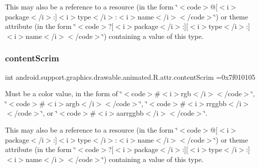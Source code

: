 This may also be a reference to a resource (in the form \char`\"{}$<$code$>$@\mbox{[}$<$i$>$package$<$/i$>$\+:\mbox{]}$<$i$>$type$<$/i$>$\+:$<$i$>$name$<$/i$>$$<$/code$>$\char`\"{}) or theme attribute (in the form \char`\"{}$<$code$>$?\mbox{[}$<$i$>$package$<$/i$>$\+:\mbox{]}\mbox{[}$<$i$>$type$<$/i$>$\+:\mbox{]}$<$i$>$name$<$/i$>$$<$/code$>$\char`\"{}) containing a value of this type. \mbox{\label{classandroid_1_1support_1_1graphics_1_1drawable_1_1animated_1_1R_1_1attr_a80ba71ce265dc918d7b421bb3894d965}} 
\subsubsection{\texorpdfstring{content\+Scrim}{contentScrim}}
{\footnotesize\ttfamily int android.\+support.\+graphics.\+drawable.\+animated.\+R.\+attr.\+content\+Scrim =0x7f010105\hspace{0.3cm}{\ttfamily [static]}}

Must be a color value, in the form of \char`\"{}$<$code$>$\#$<$i$>$rgb$<$/i$>$$<$/code$>$\char`\"{}, \char`\"{}$<$code$>$\#$<$i$>$argb$<$/i$>$$<$/code$>$\char`\"{}, \char`\"{}$<$code$>$\#$<$i$>$rrggbb$<$/i$>$$<$/code$>$\char`\"{}, or \char`\"{}$<$code$>$\#$<$i$>$aarrggbb$<$/i$>$$<$/code$>$\char`\"{}. 

This may also be a reference to a resource (in the form \char`\"{}$<$code$>$@\mbox{[}$<$i$>$package$<$/i$>$\+:\mbox{]}$<$i$>$type$<$/i$>$\+:$<$i$>$name$<$/i$>$$<$/code$>$\char`\"{}) or theme attribute (in the form \char`\"{}$<$code$>$?\mbox{[}$<$i$>$package$<$/i$>$\+:\mbox{]}\mbox{[}$<$i$>$type$<$/i$>$\+:\mbox{]}$<$i$>$name$<$/i$>$$<$/code$>$\char`\"{}) containing a value of this type. \mbox{\label{classandroid_1_1support_1_1graphics_1_1drawable_1_1animated_1_1R_1_1attr_ad974a06fa2f591be6a90cea179c8f234}} 
